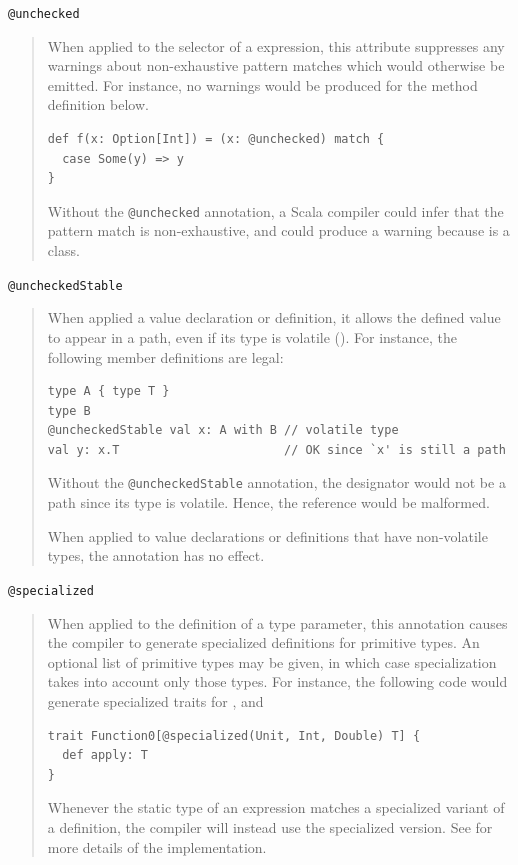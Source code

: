 \lstinline^@unchecked^
\begin{quote}
When applied to the selector of a \lstinline@match@ expression,
this attribute suppresses any warnings about non-exhaustive pattern
matches which would otherwise be emitted. For instance, no warnings
would be produced for the method definition below.
\begin{lstlisting}
def f(x: Option[Int]) = (x: @unchecked) match {
  case Some(y) => y
}
\end{lstlisting}
Without the \lstinline^@unchecked^ annotation, a Scala compiler could
infer that the pattern match is non-exhaustive, and could produce a
warning because \lstinline@Option@ is a \lstinline@sealed@ class.
\end{quote}

\lstinline^@uncheckedStable^
\begin{quote}
When applied a value declaration or definition, it allows the defined
value to appear in a path, even if its type is volatile ().
For instance, the following member definitions are legal:
\begin{lstlisting}
type A { type T }
type B 
@uncheckedStable val x: A with B // volatile type 
val y: x.T                       // OK since `x' is still a path
\end{lstlisting}
Without the \lstinline^@uncheckedStable^ annotation, the designator 
would not be a path since its type  is volatile. Hence,
the reference  would be malformed. 

When applied to value declarations or definitions that have non-volatile types, 
the annotation has no effect. 
\end{quote}

\lstinline^@specialized^
\begin{quote}
When applied to the definition of a type parameter, this annotation causes the compiler
to generate specialized definitions for primitive types. An optional list of primitive
types may be given, in which case specialization takes into account only those types.
For instance, the following code would generate specialized traits for \lstinline@Unit@, 
\lstinline@Int@ and \lstinline@Double@
\begin{lstlisting}
trait Function0[@specialized(Unit, Int, Double) T] {
  def apply: T
}
\end{lstlisting}
Whenever the static type of an expression matches a specialized variant of a definition,
the compiler will instead use the specialized version. See \cite{spec-sid} for more details
of the implementation.
\end{quote}


